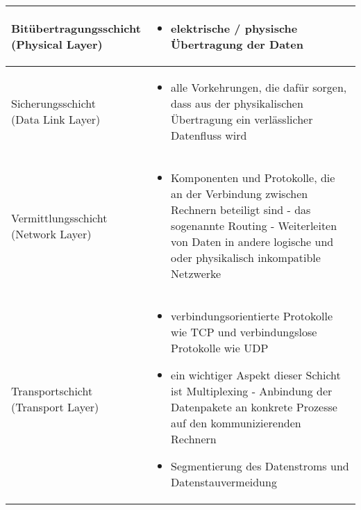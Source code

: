 \renewcommand{\tabcolsep}{1pt}
\begin{longtable}[width=\textwidth]{@{}p{}@{\hspace{3em}}p{}}
    \hline
    \makecell[l]{Bitübertragungsschicht \\ (Physical Layer)}
        & 
        \begin{itemize}
            \item elektrische / physische Übertragung der Daten 
        \end{itemize}
        
    \\\hline

    \makecell[l]{Sicherungsschicht \\ (Data Link Layer)}
        &
        \begin{itemize}
            \item alle Vorkehrungen, die dafür sorgen, dass aus der physikalischen Übertragung ein verlässlicher Datenfluss wird
        
        \end{itemize}
    \\\hline
    
    \makecell[l]{Vermittlungsschicht \\ (Network Layer)}
        &
        \begin{itemize}
            \item Komponenten und Protokolle, die an der Verbindung zwischen Rechnern beteiligt sind - das sogenannte Routing - Weiterleiten von Daten in andere logische und oder physikalisch inkompatible Netzwerke
        \end{itemize}
    \\\hline
    
    \makecell[l]{Transportschicht \\ (Transport Layer)}
        &
        \begin{itemize}
            \item verbindungsorientierte Protokolle wie TCP und verbindungslose Protokolle wie UDP
            \item ein wichtiger Aspekt dieser Schicht ist Multiplexing - Anbindung der Datenpakete an konkrete Prozesse auf den kommunizierenden Rechnern 
            \item Segmentierung des Datenstroms und Datenstauvermeidung
        \end{itemize}
    \\\hline


\end{longtable}
